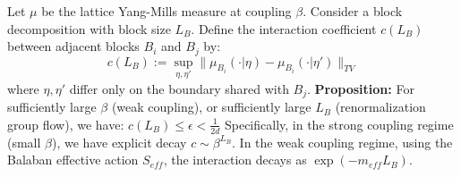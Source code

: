 \begin{center}
\end{center}

\begin{theorem}
\label{thm:rigorous-block-dobrushin}
Let $\mu$ be the lattice Yang-Mills measure at coupling $\beta$.
Consider a block decomposition with block size $L_B$.
Define the interaction coefficient $c(L_B)$ between adjacent blocks $B_i$ and $B_j$ by:
\[
c(L_B) := \sup_{\eta, \eta'} \|\mu_{B_i}(\cdot | \eta) - \mu_{B_i}(\cdot | \eta')\|_{TV}
\]
where $\eta, \eta'$ differ only on the boundary shared with $B_j$.
\textbf{Proposition:} For sufficiently large $\beta$ (weak coupling), or sufficiently large $L_B$ (renormalization group flow), we have:
\(
c(L_B) \le \epsilon < \frac{1}{2d}
\)
Specifically, in the strong coupling regime (small $\beta$), we have explicit decay $c \sim \beta^{L_B}$.
In the weak coupling regime, using the Balaban effective action $S_{eff}$, the interaction decays as $\exp(-m_{eff} L_B)$.
\end{theorem}

